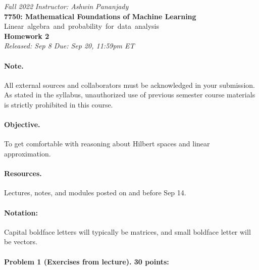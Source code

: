\documentclass[11pt,twoside]{article}
\begin{document}
\begin{center}
\normalsize {\it Fall 2022} \hfill {\it Instructor: Ashwin Pananjady} \\
\LARGE{\bf 7750: Mathematical Foundations of Machine Learning} \\
\Large \mbox{Linear algebra and probability for data analysis} \\

\vspace{2mm}
\Large{\bf Homework 2} \\
\normalsize {\it Released: Sep 8} \hfill {\it Due: Sep 20, 11:59pm ET} \\
\end{center}

\paragraph{Note.} All external sources and collaborators must be acknowledged in your submission. As stated in the syllabus, unauthorized use of previous semester course materials is strictly prohibited in this course.

\paragraph{Objective.} To get comfortable with reasoning about Hilbert spaces and linear approximation.

\paragraph{Resources.} Lectures, notes, and modules posted on and before Sep 14.

\paragraph{Notation:} Capital boldface letters will typically be matrices, and small boldface letter will be vectors. 



\paragraph{Problem 1 (Exercises from lecture). 30 points:}
\end{document}
